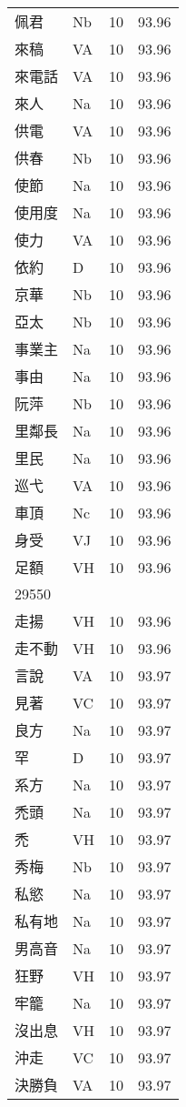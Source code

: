 \documentclass[twocolumn]{book}
\begin{document}
\begin{supertabular}{llrr}
佩君 & Nb & 10 &  93.96\\
來稿 & VA & 10 &  93.96\\
來電話 & VA & 10 &  93.96\\
來人 & Na & 10 &  93.96\\
供電 & VA & 10 &  93.96\\
供春 & Nb & 10 &  93.96\\
使節 & Na & 10 &  93.96\\
使用度 & Na & 10 &  93.96\\
使力 & VA & 10 &  93.96\\
依約 & D & 10 &  93.96\\
京華 & Nb & 10 &  93.96\\
亞太 & Nb & 10 &  93.96\\
事業主 & Na & 10 &  93.96\\
事由 & Na & 10 &  93.96\\
阮萍 & Nb & 10 &  93.96\\
里鄰長 & Na & 10 &  93.96\\
里民 & Na & 10 &  93.96\\
巡弋 & VA & 10 &  93.96\\
車頂 & Nc & 10 &  93.96\\
身受 & VJ & 10 &  93.96\\
足額 & VH & 10 &  93.96\\
29550\\
走揚 & VH & 10 &  93.96\\
走不動 & VH & 10 &  93.96\\
言說 & VA & 10 &  93.97\\
見著 & VC & 10 &  93.97\\
良方 & Na & 10 &  93.97\\
罕 & D & 10 &  93.97\\
系方 & Na & 10 &  93.97\\
禿頭 & Na & 10 &  93.97\\
禿 & VH & 10 &  93.97\\
秀梅 & Nb & 10 &  93.97\\
私慾 & Na & 10 &  93.97\\
私有地 & Na & 10 &  93.97\\
男高音 & Na & 10 &  93.97\\
狂野 & VH & 10 &  93.97\\
牢籠 & Na & 10 &  93.97\\
沒出息 & VH & 10 &  93.97\\
沖走 & VC & 10 &  93.97\\
決勝負 & VA & 10 &  93.97\\

\end{supertabular}
\end{document}
